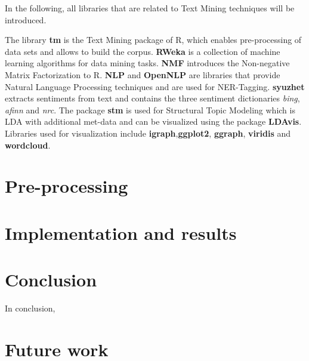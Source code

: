 \documentclass[10pt,a4paper]{article}
\begin{document}
	In the following, all libraries that are related to Text Mining techniques will be introduced.
	
	The library \textbf{tm} is the Text Mining package of R, which enables pre-processing of data sets and allows to build the corpus. \textbf{RWeka} is a collection of machine learning algorithms for data mining tasks. \textbf{NMF} introduces the Non-negative Matrix Factorization to R.
	\textbf{NLP} and \textbf{OpenNLP} are libraries that provide Natural Language Processing techniques and are used for NER-Tagging. \textbf{syuzhet} extracts sentiments from text and contains the three sentiment dictionaries \textit{bing}, \textit{afinn} and \textit{nrc}.
	The package \textbf{stm} is used for Structural Topic Modeling  which is LDA with additional met-data and can be visualized using the package \textbf{LDAvis}.
	Libraries used for visualization include \textbf{igraph},\textbf{ggplot2}, \textbf{ggraph}, \textbf{viridis} and \textbf{wordcloud}.
	
	\section{Pre-processing}
	
	
	\section{Implementation and results}
	
	
	\section{Conclusion}
	In conclusion, 

	\section{Future work}
\end{document}
